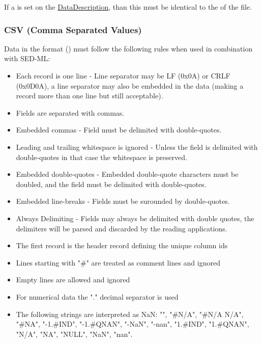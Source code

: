 If a \hyperref[sec:dimensionDescription]{} is set on the \hyperref[class:dataDescription]{DataDescription}, than this \hyperref[sec:dimensionDescription]{} must be identical to the \hyperref[sec:dimensionDescription]{} of the  file.

\subsubsection{CSV (Comma Separated Values)}
\label{sec:dataFormatCSV}
Data in the  format () must follow the following rules when used in combination with SED-ML: 

\begin{itemize}
	\item Each record is one line - Line separator may be LF (0x0A) or CRLF (0x0D0A), a line separator may also be embedded in the data (making a record more than one line but still acceptable).
    \item Fields are separated with commas.
    \item Embedded commas - Field must be delimited with double-quotes.
    \item Leading and trailing whitespace is ignored - Unless the field is delimited with double-quotes in that case the whitespace is preserved.
    \item Embedded double-quotes - Embedded double-quote characters must be doubled, and the field must be delimited with double-quotes.
    \item Embedded line-breaks - Fields must be surounded by double-quotes.
    \item Always Delimiting - Fields may always be delimited with double quotes, the delimiters will be parsed and discarded by the reading applications.
	\item The first record is the header record defining the unique column ids 
	\item Lines starting with "\#" are treated as comment lines and ignored
	\item Empty lines are allowed and ignored
	\item For numerical data the "." decimal separator is used
	\item The following strings are interpreted as NaN: "", "\#N/A", "\#N/A N/A", "\#NA", "-1.\#IND", "-1.\#QNAN", "-NaN", "-nan", "1.\#IND", "1.\#QNAN", "N/A", "NA", "NULL", "NaN", "nan".
\end{itemize}

